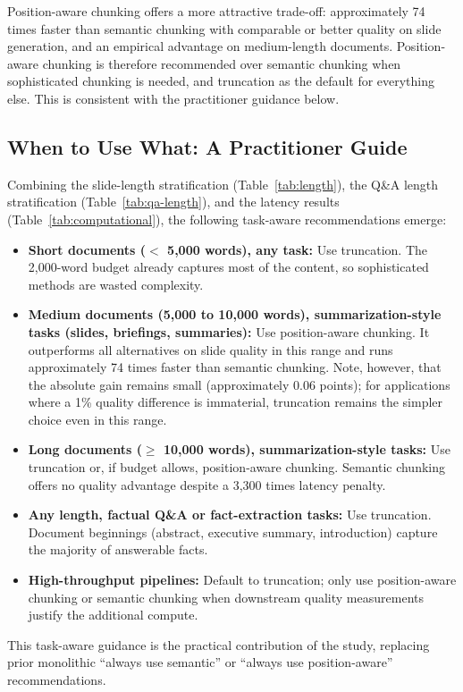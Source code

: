 \documentclass{ieeeaccess}
\begin{document}
Position-aware chunking offers a more attractive trade-off: approximately 74 times faster than semantic chunking with comparable or better quality on slide generation, and an empirical advantage on medium-length documents. Position-aware chunking is therefore recommended over semantic chunking when sophisticated chunking is needed, and truncation as the default for everything else. This is consistent with the practitioner guidance below.

\subsection{When to Use What: A Practitioner Guide}
\label{sec:guide}

Combining the slide-length stratification (Table~\ref{tab:length}), the Q\&A length stratification (Table~\ref{tab:qa-length}), and the latency results (Table~\ref{tab:computational}), the following task-aware recommendations emerge:
\begin{itemize}
    \item \textbf{Short documents ($<$ 5,000 words), any task:} Use truncation. The 2,000-word budget already captures most of the content, so sophisticated methods are wasted complexity.
    \item \textbf{Medium documents (5,000 to 10,000 words), summarization-style tasks (slides, briefings, summaries):} Use position-aware chunking. It outperforms all alternatives on slide quality in this range and runs approximately 74 times faster than semantic chunking. Note, however, that the absolute gain remains small (approximately 0.06 points); for applications where a 1\% quality difference is immaterial, truncation remains the simpler choice even in this range.
    \item \textbf{Long documents ($\geq$ 10,000 words), summarization-style tasks:} Use truncation or, if budget allows, position-aware chunking. Semantic chunking offers no quality advantage despite a 3,300 times latency penalty.
    \item \textbf{Any length, factual Q\&A or fact-extraction tasks:} Use truncation. Document beginnings (abstract, executive summary, introduction) capture the majority of answerable facts.
    \item \textbf{High-throughput pipelines:} Default to truncation; only use position-aware chunking or semantic chunking when downstream quality measurements justify the additional compute.
\end{itemize}
This task-aware guidance is the practical contribution of the study, replacing prior monolithic ``always use semantic'' or ``always use position-aware'' recommendations.
\end{document}
